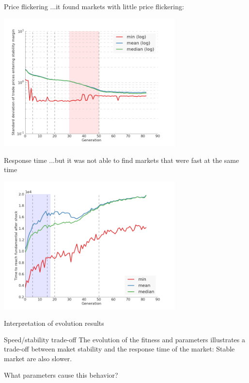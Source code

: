\documentclass[14pt]{beamer}
\begin{document}
\begin{frame}{Price flickering}
...it found markets with little price flickering:
\begin{center}
\includegraphics[width=0.7\textwidth]{evolution/stdev.png}
\end{center}
\end{frame}

\begin{frame}{Response time}
...but it was not able to find markets that were fast at the same time
\begin{center}
\includegraphics[width=0.7\textwidth]{evolution/time_to_reach_new_fundamental.png}
\end{center}
\end{frame}

\begin{frame}{Interpretation of evolution results}
\begin{block}{Speed/stability trade-off}
The evolution of the fitness and parameters illustrates a trade-off between maket stability and the response time of the market: Stable market are also slower.
\end{block}
What parameters cause this behavior?
\end{frame}
\end{document}
